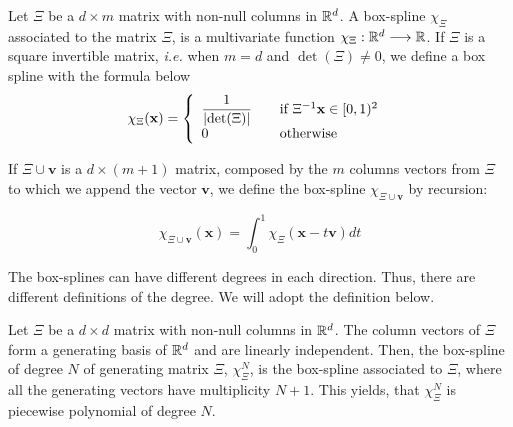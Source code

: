 \documentclass[proc]{edpsmath}
\begin{document}
\begin{dfntn}

	Let $\Xi$ be a $d \times m$ matrix with non-null columns in  $\mathbb{R}^d$. A box-spline $\chi_\Xi$ associated to the matrix $\Xi$, is a multivariate function $\chi_\Xi : \mathbb{R}^d \longrightarrow \mathbb{R}$. If $\Xi$ is a square invertible matrix, \emph{i.e.} when $m = d$ and $\det(\Xi) \neq 0$, we define a box spline with the formula below
	\begin{equation}
		\chi_{\Xi} (\mathbf{x}) = \left\{
  		\begin{array}{l l}
    		\dfrac{1}{\lvert \det(\Xi)\rvert} & \quad \text{if $\Xi^{-1}\mathbf{x} \in [0,1)^2$ }\\
    		0 & \quad \text{otherwise}
  		\end{array} \right.
	\end{equation}

	If $\Xi \cup \mathbf{v}$ is a $d \times (m + 1)$ matrix, composed by the $m$ columns vectors from $\Xi$ to which we append the vector $\mathbf{v}$, we define the box-spline $\chi_{\Xi \cup \mathbf{v}}$ by recursion:

	\begin{equation} 
	\label{eqn:boxsplines_basis}
		\chi_{\Xi \cup \mathbf{v}}(\mathbf{x}) = \int_0^ 1 \chi_\Xi(\mathbf{x}-t\mathbf{v})dt
	\end{equation}

\end{dfntn}

\rmrk The box-splines can have different degrees in each direction. Thus, there are different definitions of the degree. We will adopt the definition below.

\begin{dfntn}
Let $\Xi$ be a $d \times d$ matrix with non-null columns in $\mathbb{R}^d$. The column vectors of $\Xi$ form a generating basis of $\mathbb{R}^d$ and are linearly independent. Then, the box-spline of degree $N$ of generating matrix $\Xi$, $\chi^N_\Xi$, is the box-spline associated to $\Xi$, where all the generating vectors have multiplicity $N+1$. This yields, that $\chi^N_\Xi$ is piecewise polynomial of degree $N$.


\end{dfntn}
\end{document}
